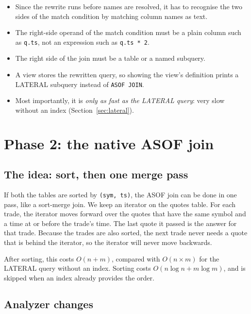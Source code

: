 \documentclass[11pt,a4paper]{article}
\newcommand{\code}[1]{\texttt{#1}}
\begin{document}
\begin{itemize}
  \item Since the rewrite runs before names are resolved, it has to recognise the two
        sides of the match condition by matching column names as text.
  \item The right-side operand of the match condition must be a plain column such as
        \code{q.ts}, not an expression such as \code{q.ts * 2}.
  \item The right side of the join must be a table or a named subquery.
  \item A view stores the rewritten query, so showing the view's definition prints a
        LATERAL subquery instead of \code{ASOF JOIN}.
  \item Most importantly, it is \emph{only as fast as the LATERAL query}: very slow
        without an index (Section~\ref{sec:lateral}).
\end{itemize}

\section{Phase 2: the native ASOF join}

\subsection{The idea: sort, then one merge pass}

If both the tables are sorted by \code{(sym, ts)}, the ASOF join can be done in one pass,
like a sort-merge join. We keep an iterator on the quotes table. For each trade, the
iterator moves forward over the quotes that have the same symbol and a time at or before
the trade's time. The last quote it passed is the answer for that trade. Because the
trades are also sorted, the next trade never needs a quote that is behind the iterator,
so the iterator will never move backwards.

After sorting, this costs $O(n + m)$, compared with $O(n \times m)$ for the LATERAL query
without an index. Sorting costs $O(n \log n + m \log m)$, and is skipped when an index
already provides the order.

\subsection{Analyzer changes}
\end{document}
